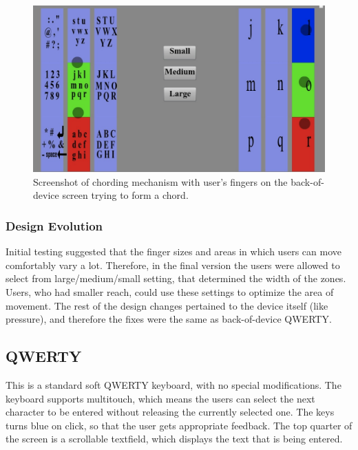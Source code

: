 \begin{figure}
    \includegraphics[scale=0.45]{Figures/chording.pdf} 
    \caption{Screenshot of chording mechanism with user's fingers on
      the back-of-device screen trying to form a chord.}
       \label{fig:chording_example}
\end{figure} 
\subsubsection{Design Evolution}

Initial testing suggested that the finger sizes and areas in which users can move comfortably vary a lot. Therefore, in the final version the users were allowed to select from large/medium/small setting, that determined the width of the zones. Users, who had smaller reach, could use these settings to optimize the area of movement. The rest of the design changes pertained to the device itself (like pressure), and therefore the fixes were the same as back-of-device QWERTY.

\subsection{QWERTY}

This is a standard soft QWERTY keyboard, with no special modifications. The keyboard supports multitouch, which means the users can select the next character to be entered without releasing the currently selected one. The keys turns blue on click, so that the user gets appropriate feedback. The top quarter of the screen is a scrollable textfield, which displays the text that is being entered.
